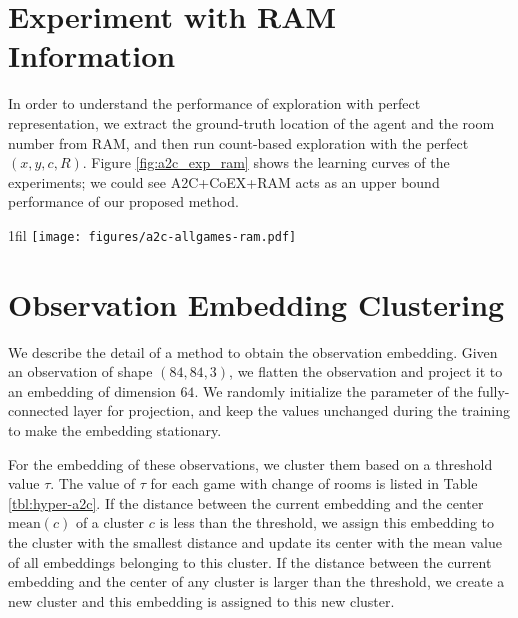 \documentclass{article} \usepackage{iclr,times}
\makeatletter
\newcommand{\coex}{{CoEX}}
\newcommand{\coexRAM}{{CoEX+RAM}}
\newcommand*{\centerfloat}{\parindent \z@
  \leftskip \z@ \@plus 1fil \@minus \textwidth
  \rightskip\leftskip
  \parfillskip \z@skip}
\makeatother
\begin{document}
{\renewcommand{\arraystretch}{1.4}  




\clearpage

\section{Experiment with RAM Information}
\label{sec:a2c_exp_ram}
In order to understand the performance of exploration with perfect representation,
we extract the ground-truth location of the agent and the room number from RAM,
and then run count-based exploration with the perfect $(x,y,c,R)$. Figure \ref{fig:a2c_exp_ram} shows the learning curves of the experiments;
we could see A2C+\coexRAM{} acts as an upper bound performance of our proposed method.
\begin{figure*}[bt] \begin{center}
\centerfloat
    \texttt{[image: figures/a2c-allgames-ram.pdf]}
    \vspace*{-5pt}
    \caption{
        Learning curves on several Atari games: A2C, A2C+\coex{}, and A2C+\coexRAM{}.
    }
    \label{fig:a2c_exp_ram}
    \vspace*{-5pt}
\end{center} \end{figure*}







\section{Observation Embedding Clustering}
\label{sec:context_embedding}
We describe the detail of a method to obtain the observation embedding.
Given an observation of shape $(84, 84, 3)$, we flatten the observation and project it to an embedding of dimension $64$.
We randomly initialize the parameter of the fully-connected layer for projection, and keep the values unchanged during the training to make the embedding stationary.

For the embedding of these observations, we cluster them based on a threshold value $\tau$.
The value of $\tau$ for each game with change of rooms is listed in Table \ref{tbl:hyper-a2c}.
If the distance between the current embedding and the center $\mathrm{mean}(c)$ of a cluster $c$ is less than the threshold,
we assign this embedding to the cluster with the smallest distance and update its center with the mean value of all embeddings belonging to this cluster.
If the distance between the current embedding and the center of any cluster is larger than the threshold,
we create a new cluster and this embedding is assigned to this new cluster.


}
\end{document}
